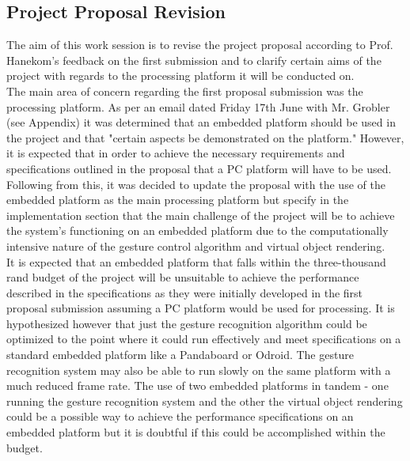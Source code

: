 \subsection{Project Proposal Revision}

The aim of this work session is to revise the project proposal according to Prof. Hanekom's feedback on the first submission and to clarify certain aims of the project with regards to the processing platform it will be conducted on.\\


The main area of concern regarding the first proposal submission was the processing platform. As per an email dated Friday 17th June with Mr. Grobler (see Appendix) it was determined that an embedded platform should be used in the project and that "certain aspects be demonstrated on the platform." However, it is expected that in order to achieve the necessary requirements and specifications outlined in the proposal that a PC platform will have to be used. Following from this, it was decided to update the proposal with the use of the embedded platform as the main processing platform but specify in the implementation section that the main challenge of the project will be to achieve the system's functioning on an embedded platform due to the computationally intensive nature of the gesture control algorithm and virtual object rendering.\\

It is expected that an embedded platform that falls within the three-thousand rand budget of the project will be unsuitable to achieve the performance described in the specifications as they were initially developed in the first proposal submission assuming a PC platform would be used for processing. It is hypothesized however that just the gesture recognition algorithm could be optimized to the point where it could run effectively and meet specifications on a standard embedded platform like a Pandaboard or Odroid. The gesture recognition system may also be able to run slowly on the same platform with a much reduced frame rate. The use of two embedded platforms in tandem - one running the gesture recognition system and the other the virtual object rendering could be a possible way to achieve the performance specifications on an embedded platform but it is doubtful if this could be accomplished within the budget. 

